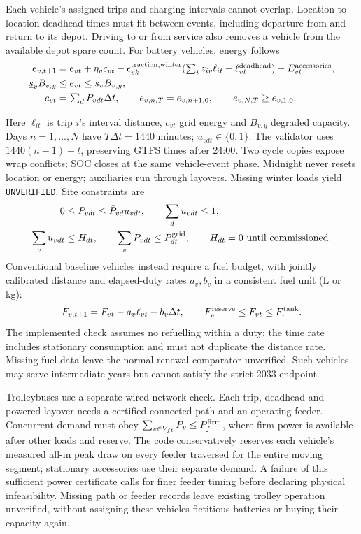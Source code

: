 \documentclass[12pt,letterpaper]{article}
\begin{document}
\begin{samepage}
Each vehicle's assigned trips and charging intervals cannot overlap. Location-to-location deadhead times must fit between events, including departure from and return to its depot. Driving to or from service also removes a vehicle from the available depot spare count. For battery vehicles, energy follows
\begin{align}
 e_{v,t+1}&=e_{vt}+\eta_v c_{vt}
   -\epsilon_{vk}^{\rm traction,winter}(\textstyle\sum_i z_{iv}\ell_{it}+\ell^{\rm deadhead}_{vt})
   -E^{\rm accessories}_{vt},\\
 \underline{s}_vB_{v,y}&\le e_{vt}\le \bar{s}_vB_{v,y},\\
 c_{vt}&=\textstyle\sum_d P_{vdt}\Delta t,\qquad
 e_{v,n,T}=e_{v,n+1,0},\qquad e_{v,N,T}\ge e_{v,1,0}.
\end{align}
\end{samepage}
Here $\ell_{it}$ is trip $i$'s interval distance, $c_{vt}$ grid energy and $B_{v,y}$ degraded capacity. Days $n=1,\ldots,N$ have $T\Delta t=1440$ minutes; $u_{vdt}\in\{0,1\}$. The validator uses $1440(n-1)+t$, preserving GTFS times after 24:00. Two cycle copies expose wrap conflicts; SOC closes at the same vehicle-event phase. Midnight never resets location or energy; auxiliaries run through layovers. Missing winter loads yield \texttt{UNVERIFIED}. Site constraints are
\begin{equation}
\begin{aligned}
 0&\le P_{vdt}\le\bar P_{vd}u_{vdt},\qquad \sum_d u_{vdt}\le1,\\
 \sum_v u_{vdt}&\le H_{dt},\qquad \sum_v P_{vdt}\le P^{\rm grid}_{dt},\qquad
 H_{dt}=0\ \mathrm{until\ commissioned}.
\end{aligned}
\end{equation}
Conventional baseline vehicles instead require a fuel budget, with jointly calibrated distance and elapsed-duty rates $a_v,b_v$ in a consistent fuel unit (L or kg):
\begin{equation}
 F_{v,t+1}=F_{vt}-a_v\ell_{vt}-b_v\Delta t,\qquad
 F_v^{\rm reserve}\le F_{vt}\le F_v^{\rm tank}.
\end{equation}
The implemented check assumes no refuelling within a duty; the time rate includes stationary consumption and must not duplicate the distance rate. Missing fuel data leave the normal-renewal comparator unverified. Such vehicles may serve intermediate years but cannot satisfy the strict 2033 endpoint.

Trolleybuses use a separate wired-network check. Each trip, deadhead and powered layover needs a certified connected path and an operating feeder. Concurrent demand must obey $\sum_{v\in V_{ft}}P_v\le P_f^{\rm firm}$, where firm power is available after other loads and reserve. The code conservatively reserves each vehicle's measured all-in peak draw on every feeder traversed for the entire moving segment; stationary accessories use their separate demand. A failure of this sufficient power certificate calls for finer feeder timing before declaring physical infeasibility. Missing path or feeder records leave existing trolley operation unverified, without assigning these vehicles fictitious batteries or buying their capacity again.
\end{document}

